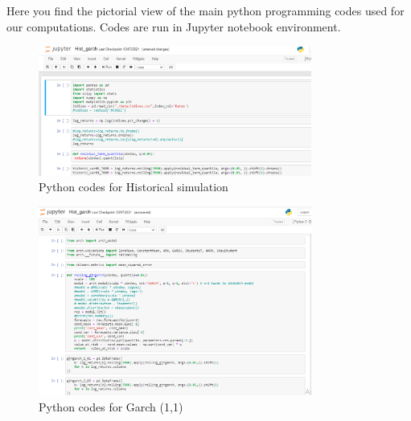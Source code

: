 \documentclass[a4paper,11pt,oneside]{book}
\begin{document}
\begin{appendices}
	\chapter{}


	Here you find the pictorial view of the main python programming codes used for our computations. Codes are run in Jupyter notebook environment.
	\begin{figure}[!h]
		\centering
		\includegraphics[width=0.8\textwidth]{figures/code1}
		\caption{Python codes for Historical simulation}
	
	\end{figure}
	
	\begin{figure}[!h]
		\centering
		\includegraphics[width=0.8\textwidth]{figures/code2}
		\caption{Python codes for Garch (1,1)}
	\end{figure}
	

\end{appendices}
\end{document}
